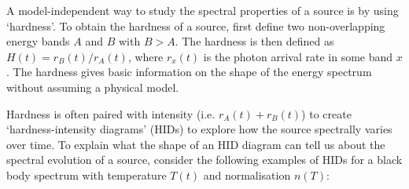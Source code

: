 \par A model-independent way to study the spectral properties of a source is by using `hardness'.  To obtain the hardness of a source, first define two non-overlapping energy bands $A$ and $B$ with $B>A$.  The hardness is then defined as $H(t)=r_B(t)/r_A(t)$, where $r_x(t)$ is the photon arrival rate in some band $x$.  The hardness gives basic information on the shape of the energy spectrum without assuming a physical model.
\par Hardness is often paired with intensity (i.e. $r_A(t)+r_B(t)$) to create `hardness-intensity diagrams' (HIDs) to explore how the source spectrally varies over time.  To explain what the shape of an HID diagram can tell us about the spectral evolution of a source, consider the following examples of HIDs for a black body spectrum with temperature $T(t)$ and normalisation $n(T)$:
